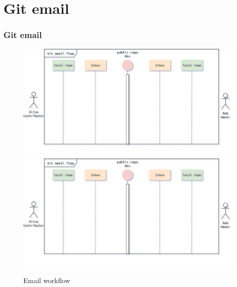 \section{Git email}
\begin{frame}
    \frametitle{Git email}
    \begin{figure}
        \begin{center}
            {
                \includegraphics[height=0.7\textheight,keepaspectratio]{./images/EmailWorkflow.png}
            }
            {
                \includegraphics[height=0.75\textheight,keepaspectratio]{./images/EmailWorkflow.png}
            }
            \caption{Email workflow}
        \end{center}
    \end{figure}
\end{frame}

